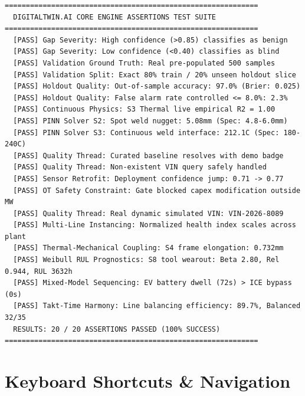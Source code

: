 \documentclass[11pt]{article}
\begin{document}
\begin{tcolorbox}[
    colback=termbg,
    colframe=termbg,
    arc=4mm,
    boxrule=0pt,
    boxsep=2mm,
    left=6mm,right=6mm,top=5mm,bottom=5mm,
    fontupper=\ttfamily\small,
    breakable
]
\begin{Verbatim}[formatcom=\color{termtext},fontsize=\small]
============================================================
  DIGITALTWIN.AI CORE ENGINE ASSERTIONS TEST SUITE
============================================================
  [PASS] Gap Severity: High confidence (>0.85) classifies as benign
  [PASS] Gap Severity: Low confidence (<0.40) classifies as blind
  [PASS] Validation Ground Truth: Real pre-populated 500 samples
  [PASS] Validation Split: Exact 80% train / 20% unseen holdout slice
  [PASS] Holdout Quality: Out-of-sample accuracy: 97.0% (Brier: 0.025)
  [PASS] Holdout Quality: False alarm rate controlled <= 8.0%: 2.3%
  [PASS] Continuous Physics: S3 Thermal live empirical R2 = 1.00
  [PASS] PINN Solver S2: Spot weld nugget: 5.08mm (Spec: 4.8-6.0mm)
  [PASS] PINN Solver S3: Continuous weld interface: 212.1C (Spec: 180-240C)
  [PASS] Quality Thread: Curated baseline resolves with demo badge
  [PASS] Quality Thread: Non-existent VIN query safely handled
  [PASS] Sensor Retrofit: Deployment confidence jump: 0.71 -> 0.77
  [PASS] OT Safety Constraint: Gate blocked capex modification outside MW
  [PASS] Quality Thread: Real dynamic simulated VIN: VIN-2026-8089
  [PASS] Multi-Line Instancing: Normalized health index scales across plant
  [PASS] Thermal-Mechanical Coupling: S4 frame elongation: 0.732mm
  [PASS] Weibull RUL Prognostics: S8 tool wearout: Beta 2.80, Rel 0.944, RUL 3632h
  [PASS] Mixed-Model Sequencing: EV battery dwell (72s) > ICE bypass (0s)
  [PASS] Takt-Time Harmony: Line balancing efficiency: 89.7%, Balanced 32/35
  RESULTS: 20 / 20 ASSERTIONS PASSED (100% SUCCESS)
============================================================
\end{Verbatim}
\end{tcolorbox}

\section{Keyboard Shortcuts \& Navigation}
\end{document}
